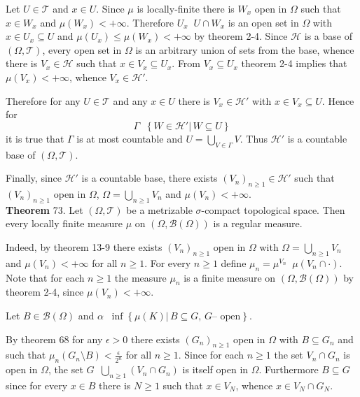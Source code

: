 \documentclass[a4paper]{article}
\newcommand{\obj}[1]{\left\{ #1 \right \}}
\newcommand{\brac}[1]{\left ( #1 \right )}
\newcommand{\induc}[1]{\left . #1 \right \vert}
\newcommand{\Tcal}{\mathcal{T}}
\newcommand{\Hcal}{\mathcal{H}}
\newcommand{\borel}[1]{\mathcal{B}\brac{#1}}
\newcommand{\defn}{\mathop{\overset{\Delta}{=}}\nolimits}
\begin{document}
Let $U\in \Tcal$ and $x\in U$. Since $\mu$ is locally-finite there is $W_x$ open in $\Omega$ such that $x\in W_x$ and $\mu\brac{W_x}<+\infty$. Therefore $U_x\defn U\cap W_x$ is an open set in $\Omega$ with $x\in U_x\subseteq U$ and $\mu\brac{U_x}\leq \mu\brac{W_x}<+\infty$ by theorem 2-4. Since $\Hcal$ is a base of $\brac{\Omega,\Tcal}$, every open set in $\Omega$ is an arbitrary union of sets from the base, whence there is $V_x\in \Hcal$ such that $x\in V_x\subseteq U_x$. From $V_x\subseteq U_x$ theorem 2-4 implies that $\mu\brac{V_x}<+\infty$, whence $V_x\in \Hcal'$.

Therefore for any $U\in \Tcal$ and any $x\in U$ there is $V_x\in\Hcal'$ with $x\in V_x\subseteq U$. Hence for \[\Gamma\defn\obj{\induc{W\in \Hcal'}\,W\subseteq U}\] it is true that $\Gamma$ is at most countable and $U=\bigcup_{V\in \Gamma} V$. Thus $\Hcal'$ is a countable base of $\brac{\Omega, \Tcal}$.

Finally, since $\Hcal'$ is a countable base, there exists $\brac{V_n}_{n\geq1}\in \Hcal'$ such that $\brac{V_n}_{n\geq1}$ open in $\Omega$, $\Omega=\bigcup_{n\geq1} V_n$ and $\mu\brac{V_n}<+\infty$.\\

\label{thm:loc_fin_metr_compact_meas} \noindent \textbf{Theorem} 73.
Let $\brac{\Omega, \Tcal}$ be a metrizable $\sigma$-compact topological space. Then every locally finite measure $\mu$ on $\brac{\Omega,\borel{\Omega}}$ is a regular measure.

Indeed, by theorem 13-9 there exists $\brac{V_n}_{n\geq1}$ open in $\Omega$ with $\Omega = \bigcup_{n\geq1} V_n$ and $\mu\brac{V_n}<+\infty$ for all $n\geq1$. For every $n\geq1$ define $\mu_n=\mu^{V_n}\defn \mu\brac{V_n\cap \cdot}$. Note that for each $n\geq1$ the measure $\mu_n$ is a finite measure on $\brac{\Omega,\borel{\Omega}}$ by theorem 2-4, since $\mu\brac{V_n}<+\infty$.

Let $B\in\borel{\Omega}$ and $\alpha \defn \inf\obj{\induc{\mu\brac{K}}\,B\subseteq G,\,G\text{-- open}}$.

By theorem 68 for any $\epsilon>0$ there exists $\brac{G_n}_{n\geq1}$ open in $\Omega$ with $B\subseteq G_n$ and such that $\mu_n\brac{G_n\setminus B}<\frac{\epsilon}{2^n}$ for all $n\geq1$. Since for each $n\geq1$ the set $V_n\cap G_n$ is open in $\Omega$, the set $G\defn \bigcup_{n\geq1} \brac{V_n\cap G_n}$ is itself open in $\Omega$. Furthermore $B\subseteq G$ since for every $x\in B$ there is $N\geq1$ such that $x\in V_N$, whence $x\in V_N\cap G_N$.
\end{document}
